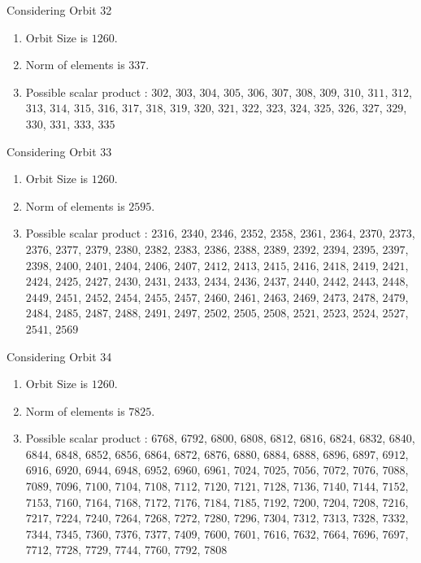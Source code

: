 \documentclass[12pt]{article}
\begin{document}
Considering Orbit 32
\begin{enumerate}
\item Orbit Size is $1260$.
\item Norm of elements is $337$.
\item Possible scalar product : $302$, $303$, $304$, $305$, $306$, $307$, $308$, $309$, $310$, $311$, $312$, $313$, $314$, $315$, $316$, $317$, $318$, $319$, $320$, $321$, $322$, $323$, $324$, $325$, $326$, $327$, $329$, $330$, $331$, $333$, $335$
\end{enumerate}
Considering Orbit 33
\begin{enumerate}
\item Orbit Size is $1260$.
\item Norm of elements is $2595$.
\item Possible scalar product : $2316$, $2340$, $2346$, $2352$, $2358$, $2361$, $2364$, $2370$, $2373$, $2376$, $2377$, $2379$, $2380$, $2382$, $2383$, $2386$, $2388$, $2389$, $2392$, $2394$, $2395$, $2397$, $2398$, $2400$, $2401$, $2404$, $2406$, $2407$, $2412$, $2413$, $2415$, $2416$, $2418$, $2419$, $2421$, $2424$, $2425$, $2427$, $2430$, $2431$, $2433$, $2434$, $2436$, $2437$, $2440$, $2442$, $2443$, $2448$, $2449$, $2451$, $2452$, $2454$, $2455$, $2457$, $2460$, $2461$, $2463$, $2469$, $2473$, $2478$, $2479$, $2484$, $2485$, $2487$, $2488$, $2491$, $2497$, $2502$, $2505$, $2508$, $2521$, $2523$, $2524$, $2527$, $2541$, $2569$
\end{enumerate}
Considering Orbit 34
\begin{enumerate}
\item Orbit Size is $1260$.
\item Norm of elements is $7825$.
\item Possible scalar product : $6768$, $6792$, $6800$, $6808$, $6812$, $6816$, $6824$, $6832$, $6840$, $6844$, $6848$, $6852$, $6856$, $6864$, $6872$, $6876$, $6880$, $6884$, $6888$, $6896$, $6897$, $6912$, $6916$, $6920$, $6944$, $6948$, $6952$, $6960$, $6961$, $7024$, $7025$, $7056$, $7072$, $7076$, $7088$, $7089$, $7096$, $7100$, $7104$, $7108$, $7112$, $7120$, $7121$, $7128$, $7136$, $7140$, $7144$, $7152$, $7153$, $7160$, $7164$, $7168$, $7172$, $7176$, $7184$, $7185$, $7192$, $7200$, $7204$, $7208$, $7216$, $7217$, $7224$, $7240$, $7264$, $7268$, $7272$, $7280$, $7296$, $7304$, $7312$, $7313$, $7328$, $7332$, $7344$, $7345$, $7360$, $7376$, $7377$, $7409$, $7600$, $7601$, $7616$, $7632$, $7664$, $7696$, $7697$, $7712$, $7728$, $7729$, $7744$, $7760$, $7792$, $7808$
\end{enumerate}
\end{document}
